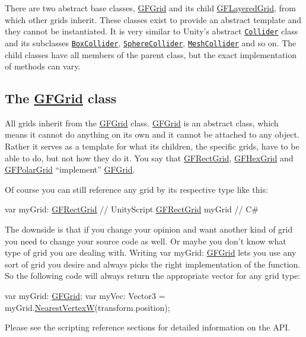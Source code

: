There are two abstract base classes, \hyperlink{class_g_f_grid}{G\+F\+Grid} and its child \hyperlink{class_g_f_layered_grid}{G\+F\+Layered\+Grid}, from which other grids inherit. These classes exist to provide an abstract template and they cannot be instantiated. It is very similar to Unity's abstract \href{http://docs.unity3d.com/Documentation/ScriptReference/Collider.html}{\tt Collider} class and its subclasses \href{http://docs.unity3d.com/Documentation/ScriptReference/BoxCollider.html}{\tt Box\+Collider}, \href{http://docs.unity3d.com/Documentation/ScriptReference/SphereCollider.html}{\tt Sphere\+Collider}, \href{http://docs.unity3d.com/Documentation/ScriptReference/MeshCollider.html}{\tt Mesh\+Collider} and so on. The child classes have all members of the parent class, but the exact implementation of methods can vary.

\subsection*{The \hyperlink{class_g_f_grid}{G\+F\+Grid} class }

All grids inherit from the \hyperlink{class_g_f_grid}{G\+F\+Grid} class. \hyperlink{class_g_f_grid}{G\+F\+Grid} is an abstract class, which means it cannot do anything on its own and it cannot be attached to any object. Rather it serves as a template for what its children, the specific grids, have to be able to do, but not how they do it. You say that \hyperlink{class_g_f_rect_grid}{G\+F\+Rect\+Grid}, \hyperlink{class_g_f_hex_grid}{G\+F\+Hex\+Grid} and \hyperlink{class_g_f_polar_grid}{G\+F\+Polar\+Grid} “implement” \hyperlink{class_g_f_grid}{G\+F\+Grid}.

Of course you can still reference any grid by its respective type like this\+: 
\begin{DoxyCode}
var myGrid: \hyperlink{class_g_f_rect_grid}{GFRectGrid} \textcolor{comment}{// UnityScript}
\hyperlink{class_g_f_rect_grid}{GFRectGrid} myGrid \textcolor{comment}{// C#}
\end{DoxyCode}
 The downside is that if you change your opinion and want another kind of grid you need to change your source code as well. Or maybe you don’t know what type of grid you are dealing with. Writing {\ttfamily var my\+Grid\+: \hyperlink{class_g_f_grid}{G\+F\+Grid}} lets you use any sort of grid you desire and always picks the right implementation of the function. So the following code will always return the appropriate vector for any grid type\+: 
\begin{DoxyCode}
var myGrid: \hyperlink{class_g_f_grid}{GFGrid};
var myVec: Vector3 = myGrid.\hyperlink{class_g_f_grid_a5865880fa767bf5562301bca419b8bb9_a5865880fa767bf5562301bca419b8bb9}{NearestVertexW}(transform.position);
\end{DoxyCode}
 Please see the scripting reference sections for detailed information on the A\+P\+I.

